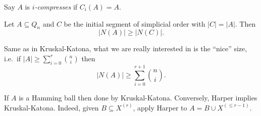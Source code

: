 \documentclass[a4paper]{article}
\begin{document}
Say \(A\) is \emph{\(i\)-compresses} if \(C_i(A) = A\).

\begin{theorem}[Harper]
  Let \(A \subseteq Q_n\) and \(C\) be the initial segment of simplicial order with \(|C| = |A|\). Then
  \[
    |N(A)| \geq |N(C)|.
  \]
\end{theorem}

Same as in Kruskal-Katona, what we are really interested in is the ``nice'' size, i.e.\ if \(|A| \geq \sum_{i = 0}^r \binom{n}{i}\) then
\[
  |N(A)| \geq \sum_{i = 0}^{r + 1} \binom{n}{i}.
\]

\begin{remark}\leavevmode
  If \(A\) is a Hamming ball then done by Kruskal-Katona. Conversely, Harper implies Kruskal-Katona. Indeed, given \(B \subseteq X^{(r)}\), apply Harper to \(A = B \cup X^{(\leq r - 1)}\).
\end{remark}

\end{document}
